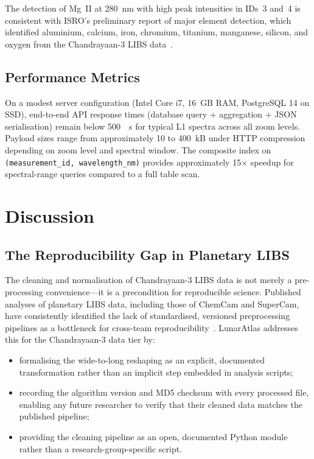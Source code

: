 \documentclass[a4paper,twocolumn,10pt]{article}
\begin{document}
The detection of Mg~II at 280~nm with high peak intensities in IDs~3
and~4 is consistent with ISRO's preliminary report of major element
detection, which identified aluminium, calcium, iron, chromium,
titanium, manganese, silicon, and oxygen from the Chandrayaan-3 LIBS
data~\cite{ISROCh3}.

\subsection{Performance Metrics}

On a modest server configuration (Intel Core i7, 16~GB RAM,
PostgreSQL 14 on SSD), end-to-end API response times (database query
+ aggregation + JSON serialisation) remain below \SI{500}{\milli
\second} for typical L1 spectra across all zoom levels.
Payload sizes range from approximately 10 to 400~kB under HTTP
compression depending on zoom level and spectral window.  The
composite index on \texttt{(measurement\_id, wavelength\_nm)}
provides approximately 15$\times$ speedup for spectral-range queries
compared to a full table scan.


\section{Discussion}
\label{sec:discussion}

\subsection{The Reproducibility Gap in Planetary LIBS}

The cleaning and normalisation of Chandrayaan-3 LIBS data is not
merely a pre-processing convenience---it is a precondition for
reproducible science.  Published analyses of planetary LIBS data,
including those of ChemCam and SuperCam, have consistently identified
the lack of standardised, versioned preprocessing pipelines as a
bottleneck for cross-team reproducibility~\cite{Anderson2022,
Clegg2017}.  LunarAtlas addresses this for the Chandrayaan-3 data
tier by:

\begin{itemize}[nosep,leftmargin=*]
  \item formalising the wide-to-long reshaping as an explicit,
    documented transformation rather than an implicit step embedded in
    analysis scripts;
  \item recording the algorithm version and MD5 checksum with every
    processed file, enabling any future researcher to verify that
    their cleaned data matches the published pipeline;
  \item providing the cleaning pipeline as an open, documented Python
    module rather than a research-group-specific script.
\end{itemize}
\end{document}
